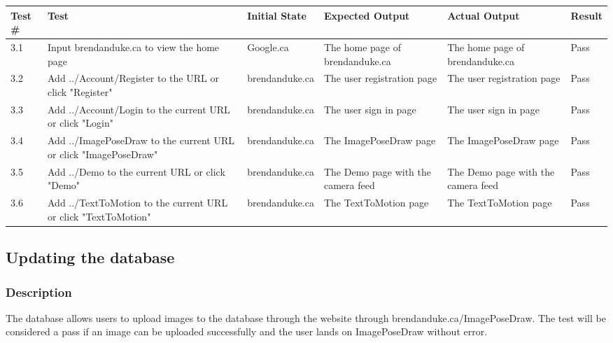 \documentclass{scrreprt}
\begin{document}
\begin{table}[H]
        \centering
        \begin{tabular}[t]{||p{0.75cm}|p{4cm}|p{2.5cm}|p{3cm}|p{2.5cm}|p{1cm}||}
                \hline
                \textbf Test \# & \textbf Test & \textbf Initial State & \textbf Expected Output & \textbf Actual Output & \textbf Result\\
                \hline\hline
                3.1 & Input brendanduke.ca to view the home page & Google.ca & The home page of brendanduke.ca & The home page of brendanduke.ca & Pass \\
                \hline
                3.2 & Add ../Account/Register to the URL or click "Register" & brendanduke.ca & The user registration page & The user registration page & Pass \\
                \hline
                3.3 & Add ../Account/Login to the current URL or click "Login" & brendanduke.ca & The user sign in page & The user sign in page & Pass \\
                \hline
                3.4 & Add ../ImagePoseDraw to the current URL or click "ImagePoseDraw" & brendanduke.ca & The ImagePoseDraw page & The ImagePoseDraw page & Pass \\
                \hline
                3.5 &  Add ../Demo to the current URL or click "Demo" & brendanduke.ca & The Demo page with the camera feed & The Demo page with the camera feed & Pass \\
                \hline
                3.6 &  Add ../TextToMotion to the current URL or click "TextToMotion" & brendanduke.ca & The TextToMotion page & The TextToMotion page & Pass \\
                \hline
        \end{tabular}
\end{table}

\subsection{Updating the database}
\subsubsection{Description}

The database allows users to upload images to the database through the website through brendanduke.ca/ImagePoseDraw. The test will be considered a pass if an image can be uploaded successfully and the user lands on ImagePoseDraw without error.
\end{document}
